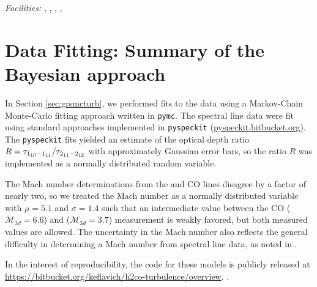 {\it Facilities:} , , ,
, 



\section{Data Fitting: Summary of the Bayesian approach}
In Section \ref{sec:grsmcturb}, we performed fits to the data using a
Markov-Chain Monte-Carlo fitting approach written in \texttt{pymc}.  The spectral line
data were fit using standard approaches implemented in \texttt{pyspeckit}
(\url{pyspeckit.bitbucket.org}).  The \texttt{pyspeckit} fits yielded an
estimate of the optical depth ratio $R = \tau_{1_{10}-1_{11}}/\tau_{2_{11}-2_{12}}$ with approximately
Gaussian error bars, so the ratio $R$ was implemented as a normally distributed
random variable.

The Mach number determinations from the \formaldehyde and CO lines disagree by
a factor of nearly two, so we treated the Mach number as a normally distributed
variable with $\mu=5.1$ and $\sigma=1.4$ such that an intermediate value
between the CO ($\mathcal{M}_{3d} = 6.6$) and \formaldehyde ($\mathcal{M}_{3d}
= 3.7$) measurement is weakly favored, but both measured values are allowed.
The uncertainty in the Mach number also reflects the general difficulty in determining
a Mach number from spectral line data, as noted in \citet{Schneider2013a}.

In the interest of reproducibility, the code for these models is publicly
released at \url{https://bitbucket.org/keflavich/h2co-turbulence/overview}.
.

